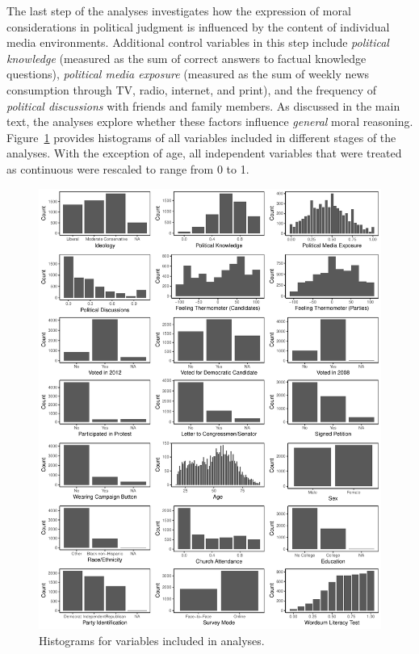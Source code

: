 \documentclass[12pt]{article}
\begin{document}
The last step of the analyses investigates how the expression of moral considerations in political judgment is influenced by the content of individual media environments. Additional control variables in this step include \textit{political knowledge} (measured as the sum of correct answers to factual knowledge questions), \textit{political media exposure} (measured as the sum of weekly news consumption through TV, radio, internet, and print), and the frequency of \textit{political discussions} with friends and family members. As discussed in the main text, the analyses explore whether these factors influence \textit{general} moral reasoning. Figure~\ref{fig:app_desc} provides histograms of all variables included in different stages of the analyses. With the exception of age, all independent variables that were treated as continuous were rescaled to range from 0 to 1.

\begin{figure}[h]\centering
\includegraphics[width=\textwidth]{../calc/fig/app_desc.pdf}
\caption{Histograms for variables included in analyses.}\label{fig:app_desc}
\end{figure}
\end{document}
